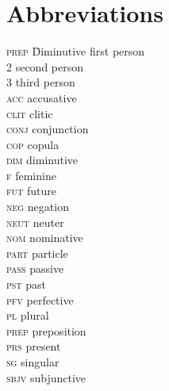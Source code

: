 \documentclass[output=paper]{LSP/langsci}
\begin{document}
\section*{Abbreviations}
\begin{multicols}{3}
\begin{tabbing}
\textsc{prep}\hspace{1em} \= Diminutive             \>  first person\\
2             \>  second person\\
3             \>  third person\\
\textsc{acc} \> accusative\\
\textsc{clit} \> clitic\\
\textsc{conj} \> conjunction\\
\textsc{cop} \> copula\\
\textsc{dim} \> diminutive\\
\textsc{f} \>     feminine\\
\textsc{fut} \> future\\
\textsc{neg} \> negation\\
\textsc{neut} \> neuter\\
\textsc{nom} \> nominative\\
\textsc{part} \> particle\\
\textsc{pass} \> passive\\
\textsc{pst} \> past\\
\textsc{pfv} \> perfective\\
\textsc{pl} \>     plural\\
\textsc{prep} \> preposition\\
\textsc{prs} \> present\\
\textsc{sg} \>     singular\\
\textsc{sbjv} \> subjunctive\\
\end{tabbing}
\end{multicols}
\end{document}
